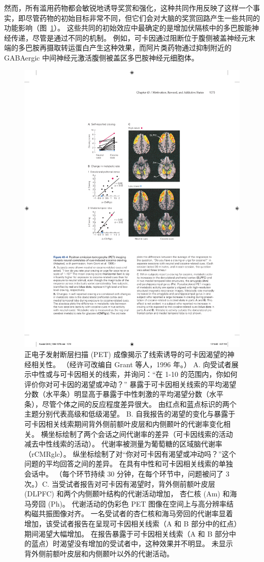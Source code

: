 然而，所有滥用药物都会敏锐地诱导奖赏和强化，这种共同作用反映了这样一个事实，即尽管药物的初始目标非常不同，但它们会对大脑的奖赏回路产生一些共同的功能影响（图~\ref{fig:43_4}）。
这些共同的初始效应中最确定的是增加伏隔核中的多巴胺能神经传递，尽管是通过不同的机制。
例如，可卡因通过阻断位于腹侧被盖神经元末端的多巴胺再摄取转运蛋白产生这种效果，而阿片类药物通过抑制附近的 GABAergic 中间神经元激活腹侧被盖区多巴胺神经元细胞体。


\begin{figure}[htbp]
	\centering
	\includegraphics[width=0.6\linewidth]{chap43/fig_43_4}
	\caption{正电子发射断层扫描 (PET) 成像揭示了线索诱导的可卡因渴望的神经相关性。 （经许可改编自 Grant 等人，1996 年。） A. 向受试者展示中性或与可卡因相关的线索，并询问：“在 1-10 的范围内，你如何评价你对可卡因的渴望或冲动？” 暴露于可卡因相关线索的平均渴望分数（水平条）明显高于暴露于中性刺激的平均渴望分数（水平条），尽管个体之间的反应程度差异很大。 由红点和蓝点标识的两个主题分别代表高级和低级渴望。 B. 自我报告的渴望的变化与暴露于可卡因相关线索期间背外侧前额叶皮层和内侧颞叶的代谢率变化相关。 横坐标绘制了两个会话之间代谢率的差异（可卡因线索的活动减去中性线索的活动）。 代谢率被测量为葡萄糖的区域脑代谢率（rCMRglc）。 纵坐标绘制了对“你对可卡因有渴望或冲动吗？”这个问题的平均回答之间的差异。 在具有中性和可卡因相关线索的单独会话中。 （每个环节持续 30 分钟，在每个环节中，问题被问了 3 次。）C. 当受试者报告对可卡因有渴望时，背外侧前额叶皮层 (DLPFC) 和两个内侧颞叶结构的代谢活动增加， 杏仁核 (Am) 和海马旁回 (Ph)。 代谢活动的伪彩色 PET 图像在空间上与高分辨率结构磁共振图像对齐。 一名受试者的杏仁核和海马旁回的代谢率显着增加，该受试者报告在呈现可卡因相关线索（A 和 B 部分中的红点）期间渴望大幅增加。 在报告暴露于可卡因相关线索（A 和 B 部分中的蓝点）时渴望没有增加的受试者中，这种效果并不明显。 未显示背外侧前额叶皮层和内侧颞叶以外的代谢活动。}
	\label{fig:43_4}
\end{figure}


